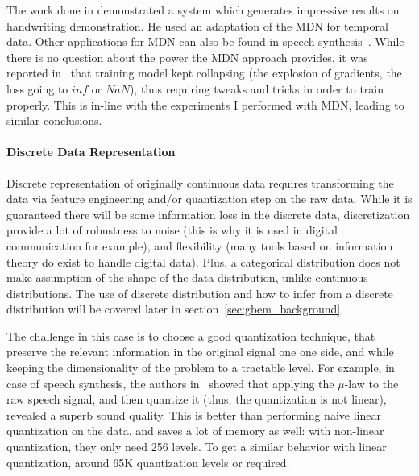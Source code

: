      \par The work done in \citet{graves2013generating} demonstrated a system which generates impressive results on handwriting demonstration. He used an adaptation of the MDN for temporal data. Other applications for MDN can also be found in speech synthesis~\citep{zen2014deep,wang2016gating,Wang2017AnAR}. While there is no question about the power the MDN approach provides, it was reported in~\citep{graves2013generating} that training model kept collapsing (the explosion of gradients, the loss going to $inf$ or $NaN$), thus requiring tweaks and tricks in order to train properly. This is in-line with the experiments I performed with MDN, leading to similar conclusions.
    \paragraph{Discrete Data Representation}
      \par Discrete representation of originally continuous data requires transforming the data via feature engineering and/or quantization step on the raw data. While it is guaranteed there will be some information loss in the discrete data, discretization provide a lot of robustness to noise (this is why it is used in digital communication for example), and flexibility (many tools based on information theory do exist to handle digital data). Plus, a categorical distribution does not make assumption of the shape of the data distribution, unlike continuous distributions. The use of discrete distribution and how to infer from a discrete distribution will be covered later in section~\ref{sec:gbem_background}.

      \par The challenge in this case is to choose a good quantization technique, that preserve the relevant information in the original signal one one side, and while keeping the dimensionality of the problem to a tractable level. For example, in case of speech synthesis, the authors in~\citep{oord2016pixel,oord2016wavenet} showed that applying the $\mu$-law to the raw speech signal, and then quantize it (thus, the quantization is not linear), revealed a superb sound quality. This is better than performing naive linear quantization on the data, and saves a lot of memory as well: with non-linear quantization, they only need 256 levels. To get a similar behavior with linear quantization, around 65K quantization levels or required.

